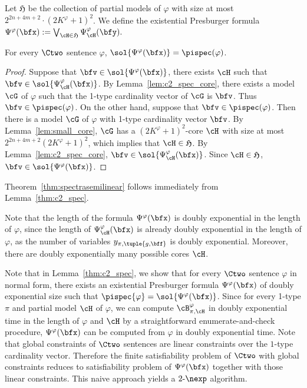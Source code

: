 Let $\mathfrak{H}$ be the collection of partial models of $\varphi$ with size at most $2^{2n+4m+2} \cdot (2K^\varphi+1)^2$.
We define the existential Presburger formula 
$\Psi^\varphi(\bfx)
 := 
\bigvee_{\cH \in \mathfrak{H}}
\Psi^\varphi_{\cH}(\bfy).$

\begin{lemma}\label{thm:c2_spec}
    For every $\Ctwo$ sentence $\varphi$,
    $\sol{\Psi^\varphi(\bfx)} = \pispec(\varphi)$.
\end{lemma}

\begin{proof}
    Suppose that $\bfv \in \sol{\Psi^\varphi(\bfx)}$,
    there exists $\cH$ such that $\bfv \in \sol{\Psi^\varphi_\cH(\bfx)}$.
    By Lemma~\ref{lem:c2_spec_core},
    there exists a model $\cG$ of $\varphi$ such that the 1-type cardinality vector of $\cG$ is $\bfv$.
    Thus $\bfv \in \pispec(\varphi)$.
    On the other hand, suppose that $\bfv \in \pispec(\varphi)$.
    Then there is a model $\cG$ of $\varphi$ with 1-type cardinality vector  $\bfv$.
    By Lemma~\ref{lem:small_core}, $\cG$ has a $(2K^\varphi+1)^2$-core $\cH$ with size at most $2^{2n+4m+2}(2K^\varphi+1)^2$,
    which implies that $\cH \in \mathfrak{H}$.
    By Lemma~\ref{lem:c2_spec_core},
    $\bfv \in \sol{\Psi^\varphi_\cH(\bfx)}$.
    Since $\cH \in \mathfrak{H}$,
    $\bfv \in \sol{\Psi^\varphi(\bfx)}$.
\end{proof}

Theorem~\ref{thm:spectrasemilinear} follows immediately from Lemma~\ref{thm:c2_spec}.

Note that the length of the formula $\Psi^\varphi(\bfx)$ is doubly exponential in the length of $\varphi$,
since the length of $\Psi^\varphi_\cH(\bfx)$ is already doubly exponential in the length of $\varphi$, 
as the number of variables $y_{\pi, \tuple{g, \bff}}$ is doubly exponential.
Moreover, there are doubly exponentially many possible cores $\cH$.

Note that in Lemma~\ref{thm:c2_spec},
we show that for every $\Ctwo$ sentence $\varphi$ in normal form,
there exists an existential Presburger formula $\Psi^\varphi(\bfx)$ of doubly exponential size 
such that $\pispec{\varphi} = \sol{\Psi^\varphi(\bfx)}$.
Since for every 1-type $\pi$ and partial model $\cH$ of $\varphi$, we can compute $\cB^{\varphi}_{\pi, \cH}$ in doubly exponential time in the length of $\varphi$ and $\cH$ by a straightforward enumerate-and-check procedure,
$\Psi^\varphi(\bfx)$ can be computed from $\varphi$ in doubly exponential time.
Note that global constraints of $\Ctwo$ sentences are linear constraints over the $1$-type cardinality vector.
Therefore the finite satisfiability problem of $\Ctwo$ with global constraints reduces
to satisfiability problem of $\Psi^\varphi(\bfx)$ together with those linear constraints.
This naive approach yields a $2\text{-}\nexp$ algorithm.

